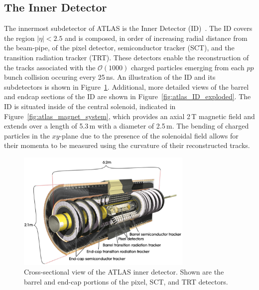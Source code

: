 \subsection{The Inner Detector}
\label{sec:inner_detector}

The innermost subdetector of ATLAS is the Inner Detector (ID)~\cite{Haywood:331064}.
The ID covers the region $\lvert \eta \rvert < 2.5$ and is composed, in order
of increasing radial distance from the beam-pipe, of the pixel detector,
semiconductor tracker (SCT), and the transition radiation tracker (TRT).
These detectors enable the reconstruction of the tracks associated with
the $\mathcal{O}(1000)$ charged particles emerging from each $pp$ bunch collision occuring
every 25\,ns.
An illustration of the ID and its subdetectors is shown in Figure~\ref{fig:atlas_inner_detector}.
Additional, more detailed views of the barrel and endcap sections of the ID are shown in Figure~\ref{fig:atlas_ID_exploded}.
The ID is situated inside of the central solenoid, indicated in Figure~\ref{fig:atlas_magnet_system},
which provides an axial 2\,T magnetic field and extends over a length of 5.3\,m with a diameter of 2.5\,m.
The bending of charged particles in the $xy$-plane due to the presence of the solenoidal
field allows for their momenta to be measured using the curvature of their reconstructed tracks.

\begin{figure}[!htb]
    \begin{center}
        \includegraphics[width=0.75\textwidth]{figures/chapter2/inner_detector/atlas_inner_detector}
        \caption{
            Cross-sectional view of the ATLAS inner detector. Shown are the barrel
            and end-cap portions of the pixel, SCT, and TRT detectors.
        }
        \label{fig:atlas_inner_detector}
    \end{center}
\end{figure}

